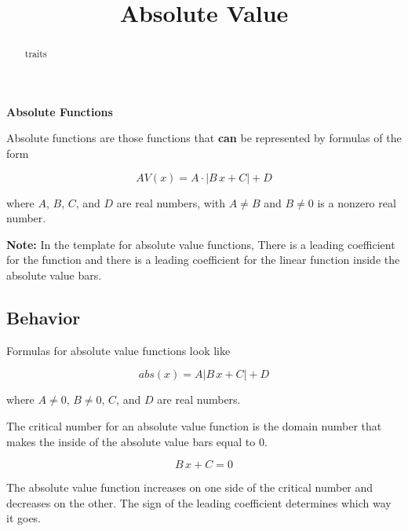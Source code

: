 \documentclass{ximera}
\title{Absolute Value}
\begin{document}
\begin{abstract}
traits
\end{abstract}
\maketitle





\begin{definition} \textbf{\textcolor{green!50!black}{Absolute Functions}}

Absolute functions are those functions that \textbf{\textcolor{purple!85!blue}{can}} be represented by formulas of the form


\[      AV(x) = A \cdot | B \, x + C| + D   \]

where $A$, $B$, $C$, and $D$ are real numbers, with $A \ne B$ and $B \ne 0$ is a nonzero real number.


\end{definition}


\textbf{Note:}  In the template for absolute value functions, There is a leading coefficient for the function and there is a leading coefficient for the linear function inside the absolute value bars. \\













\subsection*{Behavior}



Formulas for absolute value functions look like

\[     abs(x) =    A  | B \, x + C | + D           \]

where $A \ne 0$, $B \ne 0$, $C$, and $D$ are real numbers.





The critical number for an absolute value function is the domain number that makes the inside of the absolute value bars equal to $0$.


\[
B \, x + C = 0
\]


The absolute value function increases on one side of the critical number and decreases on the other.  The sign of the leading coefficient determines which way it goes. \\
\end{document}
